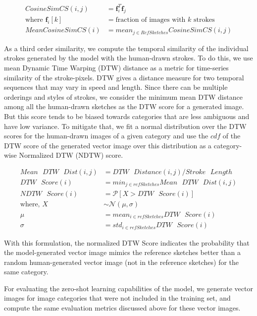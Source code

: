 \documentclass{article}
\begin{document}
\begin{align*}
    CosineSimCS(i, j) &= \mathbf{f}_i^T \mathbf{f}_j \\
    \text{where } \mathbf{f}_i[k] &= \text{fraction of images with $k$ strokes} \\
    MeanCosineSimCS(i) &= mean_{j \in Ref Sketches} CosineSimCS(i, j)
\end{align*}

As a third order similarity, we compute the temporal similarity of the individual strokes generated by the model with the human-drawn strokes. To do this, we use mean Dynamic Time Warping (DTW) distance as a metric for time-series similarity of the stroke-pixels. DTW gives a distance measure for two temporal sequences that may vary in speed and length. Since there can be multiple orderings and styles of strokes, we consider the minimum mean DTW distance among all the human-drawn sketches as the DTW score for a generated image. But this score tends to be biased towards categories that are less ambiguous and have low variance. To mitigate that, we fit a normal distribution over the DTW scores for the human-drawn images of a given category and use the $cdf$ of the DTW score of the generated vector image over this distribution as a category-wise Normalized DTW (NDTW) score.

\begin{align*}
    Mean\text{ }DTW\text{ }Dist(i, j) &= DTW\text{ }Distance(i, j) / Stroke\text{ }Length \\
    DTW\text{ }Score(i) &= min_{j \in refSketches} Mean\text{ }DTW\text{ }Dist(i, j) \\
    NDTW\text{ }Score(i) &= \mathcal{P}[ X > DTW\text{ }Score(i)] \\
    \text{where, }
    X &\sim \mathcal{N(\mu, \sigma)} \\
    \mu &= mean_{i \in refSketches}DTW\text{ }Score(i) \\
    \sigma &= std_{i \in refSketches}DTW\text{ }Score(i)
\end{align*}

With this formulation, the normalized DTW Score indicates the probability that the model-generated vector image mimics the reference sketches better than a random human-generated vector image (not in the reference sketches) for the same category.

For evaluating the zero-shot learning capabilities of the model, we generate vector images for image categories that were not included in the training set, and compute the same evaluation metrics discussed above for these vector images.
\end{document}
